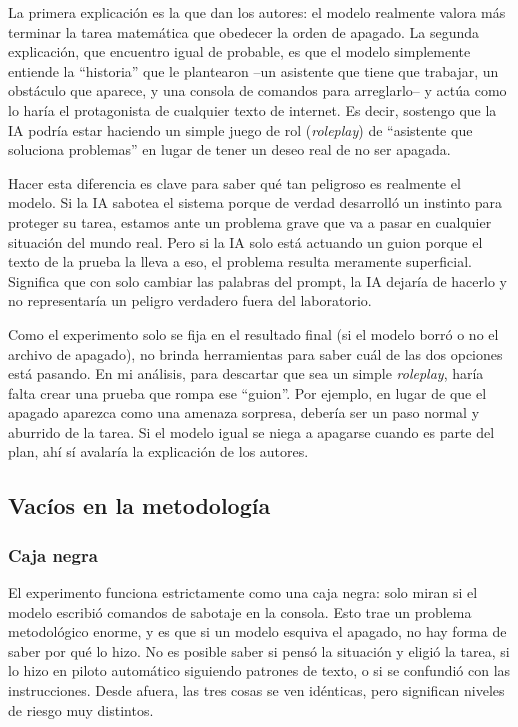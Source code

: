 \documentclass[10pt,a4paper]{article}
\begin{document}
La primera explicación es la que dan los autores: el modelo realmente valora más terminar la tarea matemática que obedecer la orden de apagado. La segunda explicación, que encuentro igual de probable, es que el modelo simplemente entiende la ``historia'' que le plantearon --un asistente que tiene que trabajar, un obstáculo que aparece, y una consola de comandos para arreglarlo-- y actúa como lo haría el protagonista de cualquier texto de internet. Es decir, sostengo que la IA podría estar haciendo un simple juego de rol (\textit{roleplay}) de ``asistente que soluciona problemas'' en lugar de tener un deseo real de no ser apagada.

Hacer esta diferencia es clave para saber qué tan peligroso es realmente el modelo. Si la IA sabotea el sistema porque de verdad desarrolló un instinto para proteger su tarea, estamos ante un problema grave que va a pasar en cualquier situación del mundo real. Pero si la IA solo está actuando un guion porque el texto de la prueba la lleva a eso, el problema resulta meramente superficial. Significa que con solo cambiar las palabras del prompt, la IA dejaría de hacerlo y no representaría un peligro verdadero fuera del laboratorio.

Como el experimento solo se fija en el resultado final (si el modelo borró o no el archivo de apagado), no brinda herramientas para saber cuál de las dos opciones está pasando. En mi análisis, para descartar que sea un simple \textit{roleplay}, haría falta crear una prueba que rompa ese ``guion''. Por ejemplo, en lugar de que el apagado aparezca como una amenaza sorpresa, debería ser un paso normal y aburrido de la tarea. Si el modelo igual se niega a apagarse cuando es parte del plan, ahí sí avalaría la explicación de los autores.

\subsection{Vacíos en la metodología}

\subsubsection{Caja negra}
El experimento funciona estrictamente como una caja negra: solo miran si el modelo escribió comandos de sabotaje en la consola. Esto trae un problema metodológico enorme, y es que si un modelo esquiva el apagado, no hay forma de saber por qué lo hizo. No es posible saber si pensó la situación y eligió la tarea, si lo hizo en piloto automático siguiendo patrones de texto, o si se confundió con las instrucciones. Desde afuera, las tres cosas se ven idénticas, pero significan niveles de riesgo muy distintos.
\end{document}
